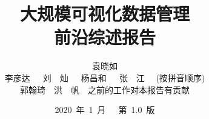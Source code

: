 \documentclass[12pt]{article}
\title{大规模可视化数据管理 \\ 前沿综述报告}
\author{袁晓如 
 \\李彦达\ \ \ 刘\ \ 灿\ \ \ 杨昌和\ \ \ 张\ \ 江 \ \ (按拼音顺序) 
 \\郭翰琦\ \ 洪\ \ 帆\ \ 之前的工作对本报告有贡献}
\date{2020\ 年\ 1\ 月\ \ \ 第\ 1.0\ 版}
\begin{document}
\begin{spacing}{1.5}
\begin{CJK*}{UTF8}{gbsn}
\renewcommand{\refname}{参考文献}



\clearpage
\maketitle

\clearpage
\tableofcontents

\clearpage

\clearpage

\clearpage

\clearpage

\clearpage

\clearpage

\printbibliography[heading = bibintoc]
% 
% 

\end{CJK*}
\end{spacing}
\end{document}
